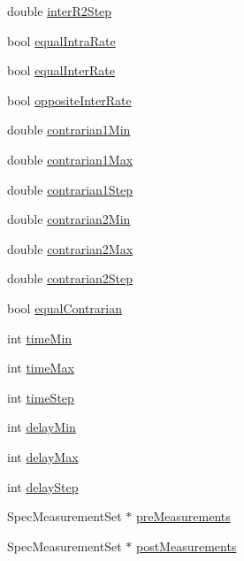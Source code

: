 \begin{DoxyCompactItemize}
\item 
double \hyperlink{class_two_communities_experiment_aadc1e8bde8ba99c123d6deb62ef0024d}{inter\-R2\-Step}
\item 
bool \hyperlink{class_two_communities_experiment_a99af0c5678c67201a249206710e53412}{equal\-Intra\-Rate}
\item 
bool \hyperlink{class_two_communities_experiment_a18e10411ee94d1695a3d365e49ab9976}{equal\-Inter\-Rate}
\item 
bool \hyperlink{class_two_communities_experiment_ade325f42fa637fae8e1c5496216c6bac}{opposite\-Inter\-Rate}
\item 
double \hyperlink{class_two_communities_experiment_ae135249e20a7ebd0483b3f02426a7772}{contrarian1\-Min}
\item 
double \hyperlink{class_two_communities_experiment_a4e41e8b55ad9be67dba9008f4caf9998}{contrarian1\-Max}
\item 
double \hyperlink{class_two_communities_experiment_a6b7cedae14a26185c3e98ff22e02761f}{contrarian1\-Step}
\item 
double \hyperlink{class_two_communities_experiment_a249455fc220b534837f794e6d4e3d520}{contrarian2\-Min}
\item 
double \hyperlink{class_two_communities_experiment_ab62dc7711b0acc972341bebfe14979f0}{contrarian2\-Max}
\item 
double \hyperlink{class_two_communities_experiment_a26d60430432743c9314ae2eb52a88627}{contrarian2\-Step}
\item 
bool \hyperlink{class_two_communities_experiment_a025e1c71fcd6c77612e4ef6005ddef4d}{equal\-Contrarian}
\item 
int \hyperlink{class_two_communities_experiment_a5c4868cca512ddd93f7cbdac070a1ed8}{time\-Min}
\item 
int \hyperlink{class_two_communities_experiment_ad08bd64c47132b4dfa2ed6d3408bcc06}{time\-Max}
\item 
int \hyperlink{class_two_communities_experiment_a06a819e995ff4f8593202ef6a425175b}{time\-Step}
\item 
int \hyperlink{class_two_communities_experiment_a861de92ba064381cf31010a57470a4b2}{delay\-Min}
\item 
int \hyperlink{class_two_communities_experiment_ab71b1171faa83b900ea3fdac52e4e74c}{delay\-Max}
\item 
int \hyperlink{class_two_communities_experiment_a4f91ecade73ca085cfba2015e38b6b33}{delay\-Step}
\item 
Spec\-Measurement\-Set $\ast$ \hyperlink{class_two_communities_experiment_a1e681dca94bf8bf967d0586acee25ac1}{pre\-Measurements}
\item 
Spec\-Measurement\-Set $\ast$ \hyperlink{class_two_communities_experiment_a78016b6845b3752c0a83f09793653ecc}{post\-Measurements}
\end{DoxyCompactItemize}

